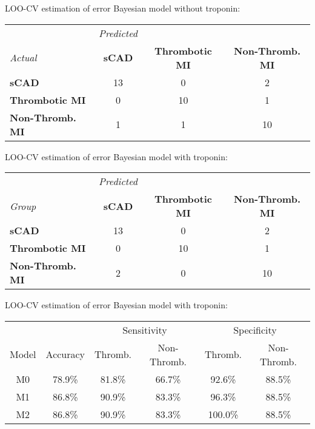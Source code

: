 \documentclass[xcolor=dvipsnames]{beamer}
\begin{document}
\begin{frame}{LOO-CV estimation of error}
	\vspace{-15pt}
	Bayesian model without troponin:
	\vspace{4ex}

\begin{tabular}{l|ccc}
	& \emph{Predicted} & & \\
	\emph{Actual} &  \textbf{sCAD} & \textbf{Thrombotic MI} & \textbf{Non-Thromb. MI} \\
	\hline
	\textbf{sCAD}   &     13    &     0    &     2\\
	\textbf{Thrombotic MI}  &  0    &    10    &     1\\
	\textbf{Non-Thromb. MI} &   1    &     1   &     10
\end{tabular}
\end{frame}

\begin{frame}{LOO-CV estimation of error}
	\vspace{-15pt}
	Bayesian model with troponin:
	\vspace{4ex}
	
\begin{tabular}{l|ccc}
	& \emph{Predicted} & & \\
	\emph{Group}  &     \textbf{sCAD} & \textbf{Thrombotic MI} & \textbf{Non-Thromb. MI} \\
	\hline
	\textbf{sCAD}   &     13    &     0    &     2\\
	\textbf{Thrombotic MI}  &  0    &    10    &     1\\
	\textbf{Non-Thromb. MI} &   2  &   0 &    10
\end{tabular}
\end{frame}

\begin{frame}{LOO-CV estimation of error}
	\vspace{-15pt}
	Bayesian model with troponin:
	\vspace{2ex}
	\begin{center}
		\begin{tabular}{|c|c|cc|cc|}
			\hline
			& & \multicolumn{2}{|c|}{Sensitivity} & \multicolumn{2}{|c|}{Specificity} \\
			Model & Accuracy & Thromb. & Non-Thromb. &  Thromb. & Non-Thromb.  \\
			\hline
			M0 & 78.9\% & 81.8\% & 66.7\% & 92.6\% & 88.5\% \\
			M1 & 86.8\% & 90.9\% & 83.3\% & 96.3\% & 88.5\% \\
			M2 & 86.8\% & 90.9\% & 83.3\% & 100.0\% & 88.5\% \\
			\hline
		\end{tabular}
	\end{center}
\end{frame}
\end{document}
